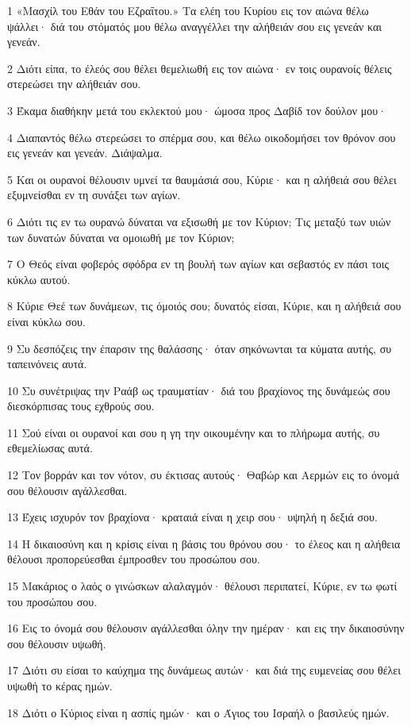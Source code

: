 \par 1 «Μασχίλ του Εθάν του Εζραΐτου.» Τα ελέη του Κυρίου εις τον αιώνα θέλω ψάλλει· διά του στόματός μου θέλω αναγγέλλει την αλήθειάν σου εις γενεάν και γενεάν.
\par 2 Διότι είπα, το έλεός σου θέλει θεμελιωθή εις τον αιώνα· εν τοις ουρανοίς θέλεις στερεώσει την αλήθειάν σου.
\par 3 Έκαμα διαθήκην μετά του εκλεκτού μου· ώμοσα προς Δαβίδ τον δούλον μου·
\par 4 Διαπαντός θέλω στερεώσει το σπέρμα σου, και θέλω οικοδομήσει τον θρόνον σου εις γενεάν και γενεάν. Διάψαλμα.
\par 5 Και οι ουρανοί θέλουσιν υμνεί τα θαυμάσιά σου, Κύριε· και η αλήθειά σου θέλει εξυμνείσθαι εν τη συνάξει των αγίων.
\par 6 Διότι τις εν τω ουρανώ δύναται να εξισωθή με τον Κύριον; Τις μεταξύ των υιών των δυνατών δύναται να ομοιωθή με τον Κύριον;
\par 7 Ο Θεός είναι φοβερός σφόδρα εν τη βουλή των αγίων και σεβαστός εν πάσι τοις κύκλω αυτού.
\par 8 Κύριε Θεέ των δυνάμεων, τις όμοιός σου; δυνατός είσαι, Κύριε, και η αλήθειά σου είναι κύκλω σου.
\par 9 Συ δεσπόζεις την έπαρσιν της θαλάσσης· όταν σηκόνωνται τα κύματα αυτής, συ ταπεινόνεις αυτά.
\par 10 Συ συνέτριψας την Ραάβ ως τραυματίαν· διά του βραχίονος της δυνάμεώς σου διεσκόρπισας τους εχθρούς σου.
\par 11 Σού είναι οι ουρανοί και σου η γη την οικουμένην και το πλήρωμα αυτής, συ εθεμελίωσας αυτά.
\par 12 Τον βορράν και τον νότον, συ έκτισας αυτούς· Θαβώρ και Αερμών εις το όνομά σου θέλουσιν αγάλλεσθαι.
\par 13 Έχεις ισχυρόν τον βραχίονα· κραταιά είναι η χειρ σου· υψηλή η δεξιά σου.
\par 14 Η δικαιοσύνη και η κρίσις είναι η βάσις του θρόνου σου· το έλεος και η αλήθεια θέλουσι προπορεύεσθαι έμπροσθεν του προσώπου σου.
\par 15 Μακάριος ο λαός ο γινώσκων αλαλαγμόν· θέλουσι περιπατεί, Κύριε, εν τω φωτί του προσώπου σου.
\par 16 Εις το όνομά σου θέλουσιν αγάλλεσθαι όλην την ημέραν· και εις την δικαιοσύνην σου θέλουσιν υψωθή.
\par 17 Διότι συ είσαι το καύχημα της δυνάμεως αυτών· και διά της ευμενείας σου θέλει υψωθή το κέρας ημών.
\par 18 Διότι ο Κύριος είναι η ασπίς ημών· και ο Άγιος του Ισραήλ ο βασιλεύς ημών.
